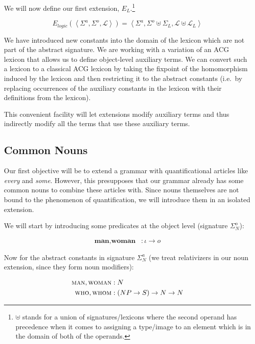 \documentclass{article}
\newcommand{\abs}[1]{\textsc{#1}}
\newcommand{\obj}[1]{\textbf{#1}}
\begin{document}
We will now define our first extension, $E_L$.\footnote{$\uplus$ stands for
  a union of signatures/lexicons where the second operand has precedence
  when it comes to assigning a type/image to an element which is in the
  domain of both of the operands.}

$$
E_{logic}(\left< \Sigma^a, \Sigma^o, \mathcal{L} \right>) = \left< \Sigma^a, \Sigma^o \uplus \Sigma_L, \mathcal{L} \uplus \mathcal{L}_L \right>
$$

We have introduced new constants into the domain of the lexicon which are
not part of the abstract signature. We are working with a variation of an
ACG lexicon that allows us to define object-level auxiliary terms. We can
convert such a lexicon to a classical ACG lexicon by taking the fixpoint of
the homomorphism induced by the lexicon and then restricting it to the
abstract constants (i.e.\ by replacing occurrences of the auxiliary
constants in the lexicon with their definitions from the lexicon).

This convenient facility will let extensions modify auxiliary terms and
thus indirectly modify all the terms that use these auxiliary terms.


\subsection{Common Nouns}

Our first objective will be to extend a grammar with quantificational
articles like \textit{every} and \textit{some}. However, this presupposes
that our grammar already has some common nouns to combine these articles
with. Since nouns themselves are not bound to the phenomenon of
quantification, we will introduce them in an isolated extension.

We will start by introducing some predicates at the object level (signature
$\Sigma^o_N$):

\begin{align*}
  \obj{man}, \obj{woman} &: \iota \to o
\end{align*}

Now for the abstract constants in signature $\Sigma^a_N$ (we treat
relativizers in our noun extension, since they form noun modifiers):

\begin{align*}
  \abs{man}, \abs{woman} &: N \\
  \abs{who}, \abs{whom} &: (NP \to S) \to N \to N
\end{align*}
\end{document}

